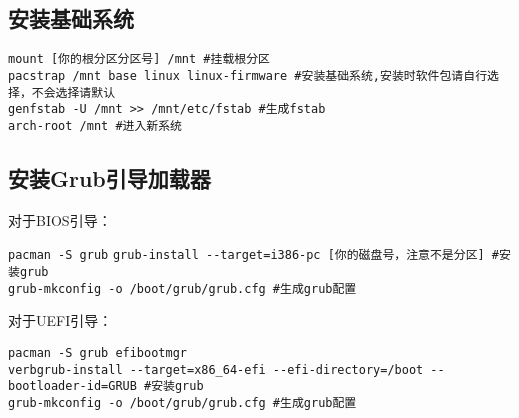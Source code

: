 \documentclass{article}
\newenvironment{singlecolumn}{%
	\par
	\noindent
	\begin{minipage}[t]{\textwidth} %
		\setlength{\parfillskip}{0pt plus 1fil} %
	}{%
	\end{minipage}
	\par
}
\begin{document}
\begin{singlecolumn}
	
\begin{tcolorbox}
	\section*{安装基础系统}
\end{tcolorbox}

\begin{tcolorbox}[
	title=bash,
	boxrule=1pt,
	fonttitle=\bfseries,
	listing only, 
	listing options={language=bash}
	]
	\verb|mount [你的根分区分区号] /mnt #挂载根分区|\\
	\verb|pacstrap /mnt base linux linux-firmware #安装基础系统,安装时软件包请自行选择，不会选择请默认|\\
	\verb|genfstab -U /mnt >> /mnt/etc/fstab #生成fstab|\\
	\verb|arch-root /mnt #进入新系统|\\
\end{tcolorbox}	

\medskip

\begin{tcolorbox}
	\section*{安装Grub引导加载器}
\end{tcolorbox}

\textcolor{bios}{对于BIOS引导：}\\
\begin{tcolorbox}[
	title=bash,
	boxrule=1pt,
	fonttitle=\bfseries,
	listing only, 
	listing options={language=bash}
	]
	\verb|pacman -S grub|
	\verb|grub-install --target=i386-pc [你的磁盘号，注意不是分区] #安装grub|\\
	\verb|grub-mkconfig -o /boot/grub/grub.cfg #生成grub配置|\\
\end{tcolorbox}
\textcolor{uefi}{对于UEFI引导：}\\
\begin{tcolorbox}[
	title=bash,
	boxrule=1pt,
	fonttitle=\bfseries,
	listing only, 
	listing options={language=bash}
	]
	\verb|pacman -S grub efibootmgr|\\
	\verb|verbgrub-install --target=x86_64-efi --efi-directory=/boot --bootloader-id=GRUB #安装grub|\\
	\verb|grub-mkconfig -o /boot/grub/grub.cfg #生成grub配置|\\
\end{tcolorbox}


\end{singlecolumn}
\end{document}
